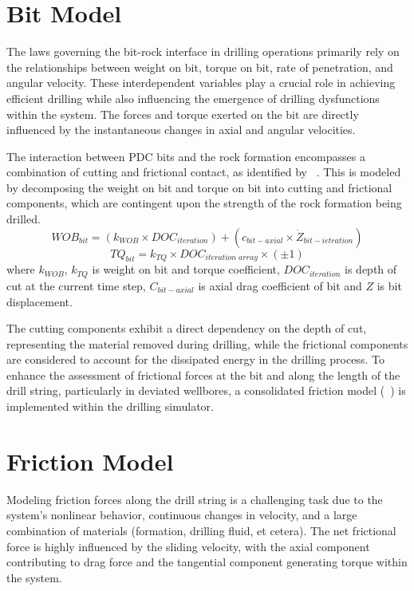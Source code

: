 \section{Bit Model}

The laws governing the bit-rock interface in drilling operations primarily rely on the relationships between weight on bit, torque on bit, rate of penetration, and angular velocity. These interdependent variables play a crucial role in achieving efficient drilling while also influencing the emergence of drilling dysfunctions within the system. The forces and torque exerted on the bit are directly influenced by the instantaneous changes in axial and angular velocities.

The interaction between PDC bits and the rock formation encompasses a combination of cutting and frictional contact, as identified by ~\cite{ref:detournay1992a}.   This is modeled by decomposing the weight on bit and torque on bit into cutting and frictional components, which are contingent upon the strength of the rock formation being drilled.
\begin{equation}\label{WOB}
  WOB_{bit} = (k_{WOB}\times DOC_{iteration}) + (c_{bit-axial}\times \dot{Z}_{bit-ietration})
\end{equation}
\begin{equation}\label{Torque}
  TQ_{bit} = k_{TQ}\times DOC_{iteration\; array}\times (\pm1)
\end{equation}
where $k_{WOB}$, $k_{TQ}$ is weight on bit and torque coefficient, $DOC_{iteration}$ is depth of cut at the current time step, $C_{bit-axial}$ is axial drag coefficient of bit and $Z$ is bit displacement.

The cutting components exhibit a direct dependency on the depth of cut, representing the material removed during drilling, while the frictional components are considered to account for the dissipated energy in the drilling process. To enhance the assessment of frictional forces at the bit and along the length of the drill string, particularly in deviated wellbores, a consolidated friction model (~\cite{ref:cayeux2020a}) is implemented within the drilling simulator.

\section{Friction Model}
Modeling friction forces along the drill string is a challenging task due to the system's nonlinear behavior, continuous changes in velocity, and a large combination of materials (formation, drilling fluid, et cetera). The net frictional force is highly influenced by the sliding velocity, with the axial component contributing to drag force and the tangential component generating torque within the system.

